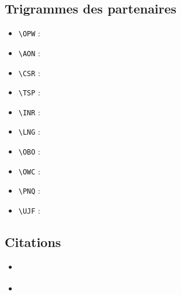 \documentclass[a4paper,11pt,twoside]{report}
\begin{document}
\subsection{Trigrammes des partenaires}

\begin{itemize}
\item \verb+\OPW+ : \OPW
\item \verb+\AON+ : \AON
\item \verb+\CSR+ : \CSR
\item \verb+\TSP+ : \TSP
\item \verb+\INR+ : \INR
\item \verb+\LNG+ : \LNG
\item \verb+\OBO+ : \OBO
\item \verb+\OWC+ : \OWC
\item \verb+\PNQ+ : \PNQ
\item \verb+\UJF+ : \UJF
\end{itemize}

\subsection{Citations}

\begin{itemize}
\item \cite{occi-core-12}
\item \cite{occi-http-rendering}
\end{itemize}





\end{document}
